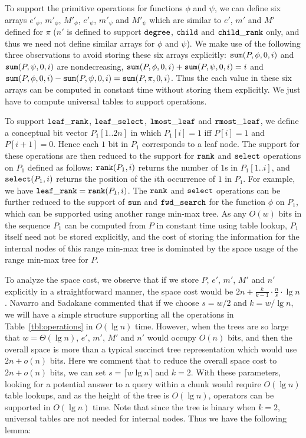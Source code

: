 To support the primitive operations for functions $\phi$ and $\psi$, we can define six arrays $e'_{\phi}$, $m'_{\phi}$, $M'_{\phi}$, $e'_{\psi}$, $m'_{\psi}$ and $M'_{\psi}$ which are similar to $e'$, $m'$ and $M'$ defined for $\pi$ ($n'$ is defined to support $\mathtt{degree}$, $\mathtt{child}$ and $\mathtt{child\_rank}$ only, and thus we need not define similar arrays for $\phi$ and $\psi$). 
We make use of the following three observations to avoid storing these six arrays explicitly: $\mathtt{sum}(P, \phi, 0, i)$ and $\mathtt{sum}(P, \psi, 0, i)$ are nondecreasing, $\mathtt{sum}(P, \phi, 0, i) + \mathtt{sum}(P, \psi, 0, i) = i$ and $\mathtt{sum}(P, \phi, 0, i) - \mathtt{sum}(P, \psi, 0, i) = \mathtt{sum}(P, \pi, 0, i)$. 
Thus the each value in these six arrays can be computed in constant time without storing them explicitly. 
We just have to compute universal tables to support operations. 

To support $\mathtt{leaf\_rank}$, $\mathtt{leaf\_select}$, $\mathtt{lmost\_leaf}$ and \linebreak $\mathtt{rmost\_leaf}$, we define a conceptual bit vector $P_1[1..2n]$ in which $P_1[i] = 1$ iff $P[i] = 1$ and $P[i+1] = 0$. 
Hence each $1$ bit in $P_1$ corresponds to a leaf node. 
The support for these operations are then reduced to the support for $\mathtt{rank}$ and $\mathtt{select}$ operations on $P_1$ defined as follows: $\mathtt{rank}(P_1, i)$ returns the number of $1$s in $P_1[1..i]$, and $\mathtt{select}(P_1, i)$ returns the position of the $i$th occurrence of $1$ in $P_1$. 
For example, we have $\mathtt{leaf\_rank} = \mathtt{rank}(P_1, i)$. 
The $\mathtt{rank}$ and $\mathtt{select}$ operations can be further reduced to the support of $\mathtt{sum}$ and $\mathtt{fwd\_search}$ for the function $\phi$ on $P_1$, which can be supported using another range min-max tree. 
As any $O(w)$ bits in the sequence $P_1$ can be computed from $P$ in constant time using table lookup, $P_1$ itself need not be stored explicitly, and the cost of storing the information for the internal nodes of this range min-max tree is dominated by the space usage of the range min-max tree for $P$. 

To analyze the space cost, we observe that if we store $P$, $e'$, $m'$, $M'$ and $n'$ explicitly in a straightforward manner, the space cost would be $2n + \frac{k}{k-1} \cdot \frac{n}{s} \cdot \lg n$. 
Navarro and Sadakane commented that if we choose $s = w/2$ and $k = w / \lg n$, we will have a simple structure supporting all the operations in Table~\ref{tbl:operations} in $O(\lg n)$ time. 
However, when the trees are so large that $w = \Theta(\lg n)$, $e'$, $m'$, $M'$ and $n'$ would occupy $O(n)$ bits, and then the overall space is more than a typical succinct tree representation which would use $2n+o(n)$ bits. 
Here we comment that to reduce the overall space cost to $2n+o(n)$ bits, we can set $s = \lceil w\lg n\rceil$ and $k = 2$. With these parameters, looking for a potential answer to a query within a chunk would require $O(\lg n)$ table lookups, and as the height of the tree is $O(\lg n)$, operators can be supported in $O(\lg n)$ time. Note that since the tree is binary when $k = 2$, universal tables are not needed for internal nodes. Thus we have the following lemma:

